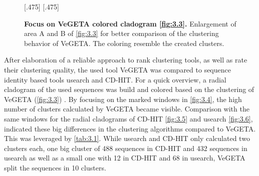     \begin{figure}[!htb]
        \centering
        [.475\textwidth]{}\hfill 
        [.475\textwidth]{}
        \caption[Focus on VeGETA colored cladogram \autoref{fig:3.3}]{\textbf{Focus on VeGETA colored cladogram \autoref{fig:3.3}.} Enlargement of area A and B of \autoref{fig:3.3} for better comparison of the clustering behavior of VeGETA. The coloring resemble the created clusters.}
        \label{fig:3.4}
    \end{figure}
    
    After elaboration of a reliable approach to rank clustering tools, as well as rate their clustering quality, the used tool VeGETA was compared to sequence identity based tools usearch and CD-HIT. For a quick overview, a radial cladogram of the used sequences was build and colored based on the clustering of VeGETA (\autoref{fig:3.3}) \autocite{vegeta}. By focusing on the marked windows in \autoref{fig:3.4}, the high number of clusters calculated by VeGETA became visible. Comparison with the same windows for the radial cladograms of CD-HIT \autoref{fig:3.5} and usearch \autoref{fig:3.6}, indicated these big differences in the clustering algorithms compared to VeGETA. This was leveraged by \autoref{tab:3.1}. While usearch and CD-HIT only calculated two clusters each, one big cluster of 488 sequences in CD-HIT and 432 sequences in usearch as well as a small one with 12 in CD-HIT and 68 in usearch, VeGETA split the sequences in 10 clusters.
    

